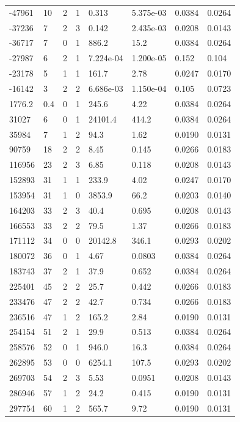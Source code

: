 \documentclass[preview]{standalone}
\begin{document}
{{\begin{tabular}{L{1.2cm}C{1.2cm} C{0.3cm}C{0.5cm} C{1.4cm}C{1.4cm} C{1.4cm}C{1.4cm}}
  -47961  &    10  & 2     &  1 &  0.313  & 5.375e-03  & 0.0384 &  0.0264   \\ 
  -37236  &     7  & 2     &  3 &  0.142  & 2.435e-03  & 0.0208 &  0.0143   \\ 
  -36717  &     7  & 0     &  1 &  886.2  & 15.2  & 0.0384 &  0.0264   \\ 
  -27987  &     6  & 2     &  1 &  7.224e-04  & 1.200e-05  & 0.152 &  0.104   \\ 
  -23178  &     5  & 1     &  1 &  161.7  & 2.78  & 0.0247 &  0.0170   \\ 
  -16142  &     3  & 2     &  2 &  6.686e-03  & 1.150e-04  & 0.105 &  0.0723   \\ 
  1776.2  &   0.4  & 0     &  1 &  245.6  & 4.22  & 0.0384 &  0.0264   \\ 
  31027  &     6  & 0     &  1 &  24101.4  & 414.2  & 0.0384 &  0.0264   \\ 
  35984  &     7  & 1     &  2 &  94.3  & 1.62  & 0.0190 &  0.0131   \\ 
  90759  &    18  & 2     &  2 &  8.45  & 0.145  & 0.0266 &  0.0183   \\ 
  116956  &    23  & 2     &  3 &  6.85  & 0.118  & 0.0208 &  0.0143   \\ 
  152893  &    31  & 1     &  1 &  233.9  & 4.02  & 0.0247 &  0.0170   \\ 
  153954  &    31  & 1     &  0 &  3853.9  & 66.2  & 0.0203 &  0.0140   \\ 
  164203  &    33  & 2     &  3 &  40.4  & 0.695  & 0.0208 &  0.0143   \\ 
  166553  &    33  & 2     &  2 &  79.5  & 1.37  & 0.0266 &  0.0183   \\ 
  171112  &    34  & 0     &  0 &  20142.8  & 346.1  & 0.0293 &  0.0202   \\ 
  180072  &    36  & 0     &  1 &  4.67  & 0.0803  & 0.0384 &  0.0264   \\ 
  183743  &    37  & 2     &  1 &  37.9  & 0.652  & 0.0384 &  0.0264   \\ 
  225401  &    45  & 2     &  2 &  25.7  & 0.442  & 0.0266 &  0.0183   \\ 
  233476  &    47  & 2     &  2 &  42.7  & 0.734  & 0.0266 &  0.0183   \\ 
  236516  &    47  & 1     &  2 &  165.2  & 2.84  & 0.0190 &  0.0131   \\ 
  254154  &    51  & 2     &  1 &  29.9  & 0.513  & 0.0384 &  0.0264   \\ 
  258576  &    52  & 0     &  1 &  946.0  & 16.3  & 0.0384 &  0.0264   \\ 
  262895  &    53  & 0     &  0 &  6254.1  & 107.5  & 0.0293 &  0.0202   \\ 
  269703  &    54  & 2     &  3 &  5.53  & 0.0951  & 0.0208 &  0.0143   \\ 
  286946  &    57  & 1     &  2 &  24.2  & 0.415  & 0.0190 &  0.0131   \\ 
  297754  &    60  & 1     &  2 &  565.7  & 9.72  & 0.0190 &  0.0131   \\ 
\hline 
\end{tabular} 

}}
\end{document}
